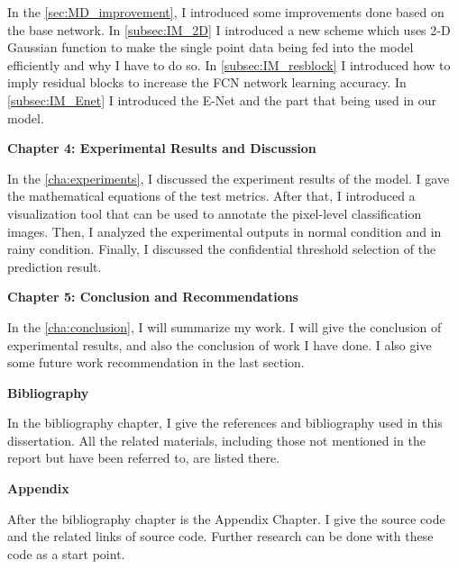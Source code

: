 \begin{spacing}{1.5}
In the \autoref{sec:MD_improvement}, I introduced some improvements done based on the base network. In \autoref{subsec:IM_2D} I introduced a new scheme which uses 2-D Gaussian function to make the single point data being fed into the model efficiently and why I have to do so. In \autoref{subsec:IM_resblock} I  introduced how to imply residual blocks to increase the FCN network learning accuracy. In \autoref{subsec:IM_Enet} I introduced the E-Net and the part that being used in our model.

{\large\textbf{Chapter 4: Experimental Results and Discussion}}

In the \autoref{cha:experiments}, I discussed the experiment results of the model. I gave the mathematical equations of the test metrics. After that, I introduced a visualization tool that can be used to annotate the pixel-level classification images. Then, I analyzed the experimental outputs in normal condition and in rainy condition. Finally, I discussed the confidential threshold selection of the prediction result.

{\large\textbf{Chapter 5: Conclusion and Recommendations}}

In the \autoref{cha:conclusion}, I will summarize my work. I will give the conclusion of experimental results, and also the conclusion of work I have done. I also give some future work recommendation in the last section.

{\large\textbf{Bibliography}}

In the bibliography chapter, I give the references and bibliography used in this dissertation. All the related materials, including those not mentioned in the report but have been referred to, are listed there.

{\large\textbf{Appendix}}

After the bibliography chapter is the Appendix Chapter. I give the source code and the related links of source code. Further research can be done with these code as a start point.

\end{spacing}
\newpage


